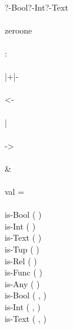 \documentclass[a4,14pt,latin1]{article}
\begin{document}
{\begin{tabbing}
\\
\>\IS\>?-Bool\OR ?-Int\OR ?-Text \\
\\
\>\IS\>zero\OR one \\
\\
\>\IS\> :\  \\
\\
\>\IS\>|+\OR |- \\
\\
\>\IS\> <-  \\
\\
\>\IS\> |  \\
\\
\>\IS\> ->   \\
\\
\>\IS\>\&  \\
\\
\>\IS\>val  =  \\
\\
\>\IS\>is-Bool (  )\OR \\
             \>   \>is-Int (  )\OR \\
             \>   \>is-Text (  )\OR \\
             \>   \>is-Tup (  )\OR \\
             \>   \>is-Rel (  )\OR \\
             \>   \>is-Func (  )\OR \\
             \>   \>is-Any (  )\OR \\
             \>   \>is-Bool (  ,  )\OR \\
             \>   \>is-Int (  ,  )\OR \\
             \>   \>is-Text (  ,  ) \\
\end{tabbing}
}
\end{document}

